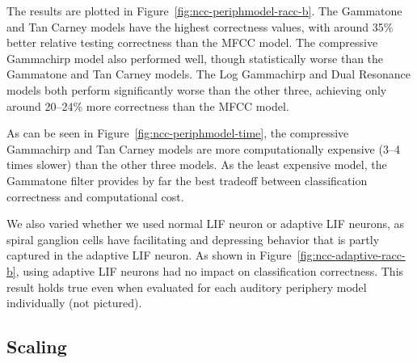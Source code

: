
The results are plotted
in Figure~\ref{fig:ncc-periphmodel-racc-b}.
The Gammatone and Tan Carney models
have the highest correctness values,
with around 35\% better relative testing correctness
than the MFCC model.
The compressive Gammachirp model
also performed well,
though statistically worse
than the Gammatone and Tan Carney models.
The Log Gammachirp and Dual Resonance models
both perform significantly worse
than the other three,
achieving only around 20--24\%
more correctness than the MFCC model.


As can be seen in Figure~\ref{fig:ncc-periphmodel-time},
the compressive Gammachirp
and Tan Carney models are
more computationally expensive
(3--4 times slower)
than the other three models.
As the least expensive model,
the Gammatone filter
provides by far the best tradeoff
between classification correctness
and computational cost.


We also varied whether we used
normal LIF neuron or adaptive LIF neurons,
as spiral ganglion cells
have facilitating and depressing behavior
that is partly captured in the adaptive LIF neuron.
As shown in Figure~\ref{fig:ncc-adaptive-racc-b},
using adaptive LIF neurons had no impact
on classification correctness.
This result holds true even when
evaluated for each auditory periphery model
individually (not pictured).

\subsection{Scaling}
\label{sec:res-ncc-scaling}

